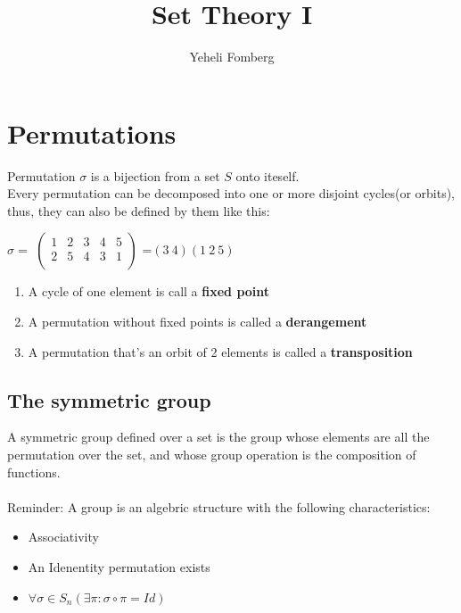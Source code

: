 \documentclass{article}
\title{\textbf{Set Theory I}}
\author{Yeheli Fomberg}
\date{}
\begin{document}
	\maketitle
	\newpage
	\tableofcontents
	\newpage
	\section{Permutations}
		Permutation $\sigma$ is a bijection from a set $S$ onto iteself. \\
		Every permutation can be decomposed into one or more disjoint cycles(or orbits), thus, they can also be defined by them like this:
		\begin{center}
			$\sigma=$
				$\begin{pmatrix}
					1 & 2 & 3 & 4 & 5\\
					2 & 5 & 4 & 3 & 1\\
				\end{pmatrix}$
			=$(3 \ 4)(1 \ 2 \ 5)$
		\end{center}
		\begin{enumerate}
			\item A cycle of one element is call a \textbf{fixed point}
			\item A permutation without fixed points is called a \textbf{derangement}
			\item A permutation that's an orbit of 2 elements is called a \textbf{transposition}
		\end{enumerate}
		
		\subsection{The symmetric group}
		A symmetric group defined over a set is the group whose elements are all the permutation over the set, and whose group operation is the composition of functions. \\\\
		Reminder: A group is an algebric structure with the following characteristics:
		
		\begin{itemize}
			\item Associativity
			\item An Idenentity permutation exists
			\item $\forall \sigma \in S_n(\exists\pi:\sigma\circ\pi=Id)$
		\end{itemize}
		
		
	\newpage
\end{document}
